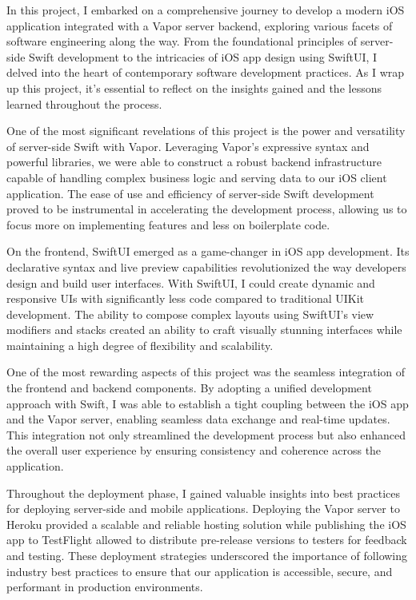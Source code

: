 \documentclass[
  biblatex,
  language=english,
  figures=false,
  sourcecodes,
  glossaries,
  index
]{kidiplom}
\begin{document}
\begin{kiconclusions}

In this project, I embarked on a comprehensive journey to develop a modern iOS application integrated with a Vapor server backend, exploring various facets of software engineering along the way. From the foundational principles of server-side Swift development to the intricacies of iOS app design using SwiftUI, I delved into the heart of contemporary software development practices. As I wrap up this project, it's essential to reflect on the insights gained and the lessons learned throughout the process.

One of the most significant revelations of this project is the power and versatility of server-side Swift with Vapor. Leveraging Vapor's expressive syntax and powerful libraries, we were able to construct a robust backend infrastructure capable of handling complex business logic and serving data to our iOS client application. The ease of use and efficiency of server-side Swift development proved to be instrumental in accelerating the development process, allowing us to focus more on implementing features and less on boilerplate code.

On the frontend, SwiftUI emerged as a game-changer in iOS app development. Its declarative syntax and live preview capabilities revolutionized the way developers design and build user interfaces. With SwiftUI, I could create dynamic and responsive UIs with significantly less code compared to traditional UIKit development. The ability to compose complex layouts using SwiftUI's view modifiers and stacks created an ability to craft visually stunning interfaces while maintaining a high degree of flexibility and scalability.

One of the most rewarding aspects of this project was the seamless integration of the frontend and backend components. By adopting a unified development approach with Swift, I was able to establish a tight coupling between the iOS app and the Vapor server, enabling seamless data exchange and real-time updates. This integration not only streamlined the development process but also enhanced the overall user experience by ensuring consistency and coherence across the application.

Throughout the deployment phase, I gained valuable insights into best practices for deploying server-side and mobile applications. Deploying the Vapor server to Heroku provided a scalable and reliable hosting solution while publishing the iOS app to TestFlight allowed to distribute pre-release versions to testers for feedback and testing. These deployment strategies underscored the importance of following industry best practices to ensure that our application is accessible, secure, and performant in production environments.


\end{kiconclusions}
\end{document}
